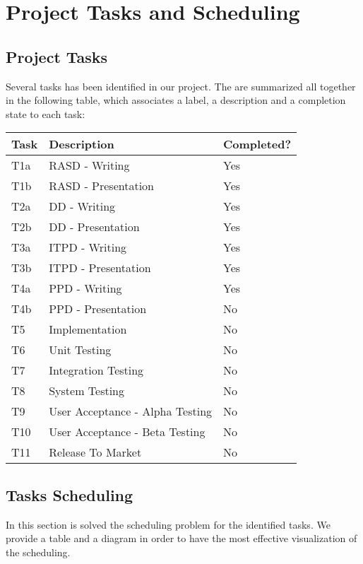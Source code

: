 \section{Project Tasks and Scheduling}
%
\subsection{Project Tasks}
Several tasks has been identified in our project.
The are summarized all together in the following table, which associates a label, a description and a completion state to each task:
\begin{center}
	\begin{tabulary}{\linewidth\tymin=70pt}{Y{2cm}|Y{6cm}|Y{2.25cm}}
		\textbf{Task} & \textbf{Description} & \textbf{Completed?}\\ \hline
		T1a & RASD - Writing & Yes \\ \hline
		T1b & RASD - Presentation & Yes \\ \hline
		T2a & DD - Writing & Yes \\ \hline
		T2b & DD - Presentation & Yes \\ \hline
		T3a & ITPD - Writing & Yes \\ \hline
		T3b & ITPD - Presentation & Yes \\ \hline
		T4a & PPD - Writing & Yes \\ \hline
		T4b & PPD - Presentation & No \\ \hline
		T5 & Implementation & No \\ \hline
		T6 & Unit Testing & No \\ \hline
		T7 & Integration Testing & No \\ \hline
		T8 & System Testing & No \\ \hline
		T9 & User Acceptance - Alpha Testing & No \\ \hline
		T10 & User Acceptance - Beta Testing & No \\ \hline
		T11 & Release To Market & No \\
	\end{tabulary}
\end{center}
%
\subsection{Tasks Scheduling}
In this section is solved the scheduling problem for the identified tasks.
We provide a table and a diagram in order to have the most effective visualization of the scheduling.
%
